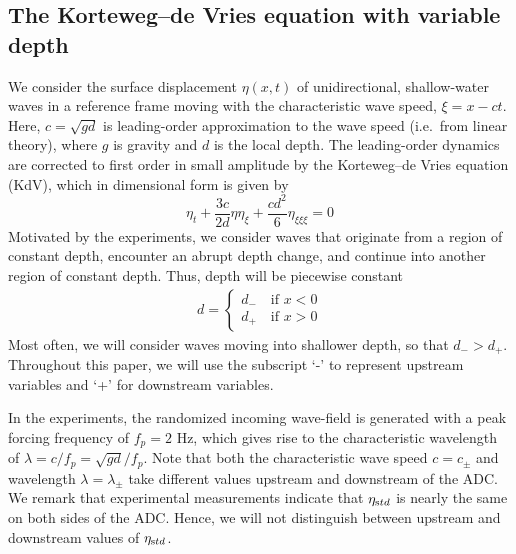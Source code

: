 \documentclass[11pt]{article}
\newcommand{\freqp}{f_p}
\newcommand{\etastd}{\eta_{\text std}}
\newcommand{\depth}{d}
\newcommand{\dup}{\depth_{-}}
\newcommand{\ddn}{\depth_{+}}
\newcommand{\lam}{\lambda}
\newcommand{\lamupdn}{\lam_{\pm}}
\begin{document}
\subsection{The Korteweg–de Vries equation with variable depth}

We consider the surface displacement $\eta(x,t)$ of unidirectional, shallow-water waves in a reference frame moving with the characteristic wave speed, $\xi = x - ct$. Here, $c = \sqrt{g \depth}$ is leading-order approximation to the wave speed (i.e.~from linear theory), where $g$ is gravity and $\depth$ is the local depth.
The leading-order dynamics are corrected to first order in small amplitude by the Korteweg–de Vries equation (KdV), which in dimensional form is given by \cite{whitham2011linear}
\begin{equation}
\label{KdV}
\eta_t + \frac{3 c}{2 \depth} \eta \eta_{\xi} + \frac{c \depth^2}{6} \eta_{\xi \xi \xi} = 0
\end{equation}
Motivated by the experiments, we consider waves that originate from a region of constant depth, encounter an abrupt depth change, and continue into another region of constant depth. Thus, depth will be piecewise constant
\begin{align}
\depth = 
\begin{cases}
\dup \quad \mbox{if } x<0 \\
\ddn \quad \mbox{if } x>0
\end{cases}
\end{align}
Most often, we will consider waves moving into shallower depth, so that $\dup > \ddn$. Throughout this paper, we will use the subscript `-' to represent upstream variables and `+' for downstream variables.

In the experiments, the randomized incoming wave-field is generated with a peak forcing frequency of $\freqp = 2$ Hz, which gives rise to the characteristic wavelength of $\lam = c/\freqp = \sqrt{g \depth} / \freqp$. Note that both the characteristic wave speed $c = c_{\pm}$ and wavelength $\lam = \lamupdn$ take different values upstream and downstream of the ADC. We remark that experimental measurements indicate that $\etastd$ is nearly the same on both sides of the ADC. Hence, we will not distinguish between upstream and downstream values of $\etastd$.
\end{document}
